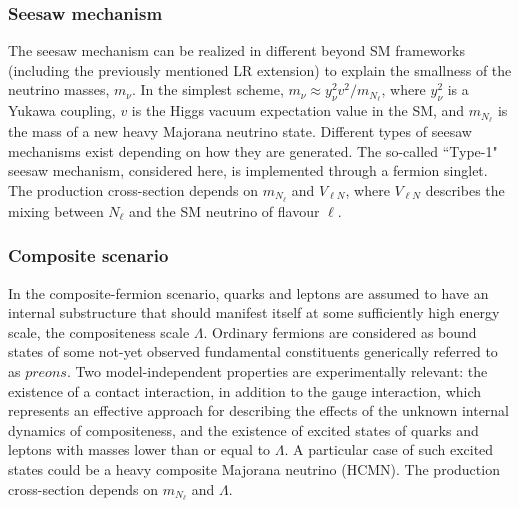 \documentclass[10pt]{article}
\begin{document}
\vspace{-0.25cm}
\subsubsection{Seesaw mechanism}
\vspace{-0.15cm}
The seesaw mechanism can be realized in different beyond SM frameworks (including the previously mentioned LR extension) to explain
the smallness of the neutrino masses, $m_{\nu}$. In the simplest scheme,  $m_{\nu} \approx y_{\nu}^{2} v^{2} / m_{N_{\ell}}$,
where $y_{\nu}^{2}$ is a Yukawa coupling, $v$ is the Higgs vacuum expectation value in the SM, and $m_{N_{\ell}}$ is the mass of a new heavy Majorana neutrino state. 
Different types of seesaw mechanisms exist depending on how they are generated. The so-called ``Type-1" seesaw mechanism, considered here, is implemented through a fermion singlet.
The production cross-section depends on $m_{N_{\ell}}$ and $V_{\ell N}$, where $V_{\ell N}$ describes the mixing between $N_{\ell}$ and the SM neutrino of flavour $\ell$.

\vspace{-0.25cm}
\subsubsection{Composite scenario}
\vspace{-0.15cm}
In the composite-fermion scenario, quarks and leptons are assumed to have an internal substructure that should manifest itself at some sufficiently high energy scale, the compositeness scale $\Lambda$.
Ordinary fermions are considered as bound states of some not-yet observed fundamental constituents generically referred to as $preons$.
Two model-independent properties are experimentally relevant: the existence of a contact interaction, in addition to the gauge
interaction, which represents an effective approach for describing the effects of the unknown internal dynamics of compositeness, and the existence of excited states of quarks and leptons
with masses lower than or equal to $\Lambda$. A particular case of such excited states could be a heavy composite Majorana neutrino (HCMN).
The production cross-section depends on $m_{N_{\ell}}$ and $\Lambda$.

\vspace{-0.25cm}
\end{document}
